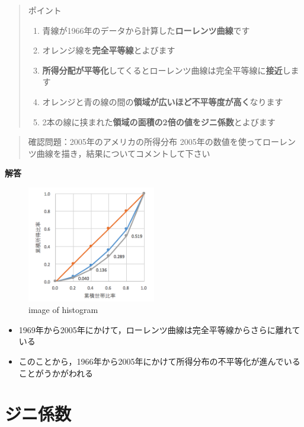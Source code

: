 \documentclass[
]{book}
\providecommand{\tightlist}{%
  \setlength{\itemsep}{0pt}\setlength{\parskip}{0pt}}
\theoremstyle{definition}
\theoremstyle{definition}
\theoremstyle{definition}
\theoremstyle{definition}
\theoremstyle{remark}
\begin{document}
\begin{quote}
ポイント

\begin{enumerate}
\def\labelenumi{\arabic{enumi}.}
\tightlist
\item
  青線が1966年のデータから計算した\textbf{ローレンツ曲線}です
\item
  オレンジ線を\textbf{完全平等線}とよびます
\item
  \textbf{所得分配が平等化}してくるとローレンツ曲線は完全平等線に\textbf{接近}します
\item
  オレンジと青の線の間の\textbf{領域が広いほど不平等度が高く}なります
\item
  2本の線に挟まれた\textbf{領域の面積の2倍の値をジニ係数}とよびます
\end{enumerate}
\end{quote}

\begin{quote}
確認問題：2005年のアメリカの所得分布
2005年の数値を使ってローレンツ曲線を描き，結果についてコメントして下さい
\end{quote}

\textbf{解答}

\begin{figure}
\centering
\includegraphics[width=0.5\textwidth,height=\textheight]{images/lec03/fig_us_lorenz2005.png}
\caption{image of histogram}
\end{figure}

\begin{itemize}
\tightlist
\item
  1969年から2005年にかけて，ローレンツ曲線は完全平等線からさらに離れている
\item
  このことから，1966年から2005年にかけて所得分布の不平等化が進んでいることがうかがわれる
\end{itemize}

\hypertarget{ux30b8ux30cbux4fc2ux6570}{%
\section{ジニ係数}\label{ux30b8ux30cbux4fc2ux6570}}
\end{document}
